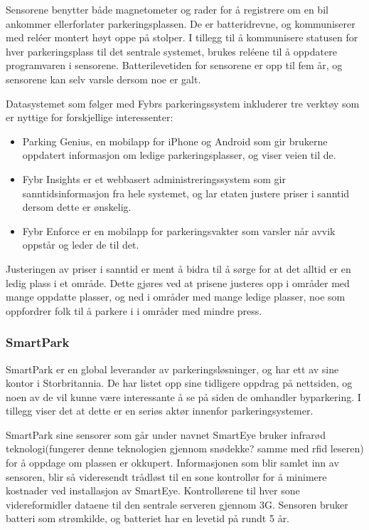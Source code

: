 \documentclass[a4paper, norsk, 12pt]{article}
\theoremstyle{remark}
\begin{document}
Sensorene benytter både magnetometer og rader for å registrere om en bil ankommer ellerforlater parkeringsplassen. De er batteridrevne, og kommuniserer med reléer montert høyt oppe på stolper. I tillegg til å kommunisere statusen for hver parkeringsplass til det sentrale systemet, brukes reléene til å oppdatere programvaren i sensorene. Batterilevetiden for sensorene er opp til fem år, og sensorene kan selv varsle dersom noe er galt. 

Datasystemet som følger med Fybrs parkeringssystem inkluderer tre verktøy som er nyttige for forskjellige interessenter:

\begin{itemize}
	\item Parking Genius, en mobilapp for iPhone og Android  som gir brukerne oppdatert informasjon om ledige parkeringsplasser, og viser veien til de.
	\item Fybr Insights er et webbasert administreringssystem som gir sanntidsinformasjon fra hele systemet, og lar etaten justere priser i sanntid dersom dette er ønskelig.
	\item Fybr Enforce er en mobilapp for parkeringsvakter som varsler når avvik oppstår og leder de til det.
\end{itemize}

Justeringen av priser i sanntid er ment å bidra til å sørge for at det alltid er en ledig plass i et område. Dette gjøres ved at prisene justeres opp i områder med mange oppdatte plasser, og ned i områder med mange ledige plasser, noe som oppfordrer folk til å parkere i i områder med mindre press.


\clearpage
\subsubsection{SmartPark}
\label{ssub:smartpark}
SmartPark er en global leverandør av parkeringsløsninger, og har ett av sine kontor i Storbritannia. De har listet opp sine tidligere oppdrag på nettsiden, og noen av de vil kunne være interessante å se på siden de omhandler byparkering. I tillegg viser det at dette er en seriøs aktør innenfor parkeringsystemer. 

SmartPark sine sensorer som går under navnet SmartEye bruker infrarød teknologi(fungerer denne teknologien gjennom snødekke? samme med rfid leseren) for å oppdage om plassen er okkupert. Informasjonen som blir samlet inn av sensoren, blir så videresendt trådløst til en sone kontrollør for å minimere kostnader ved installasjon av SmartEye. Kontrollørene til hver sone videreformidler dataene til den sentrale serveren gjennom 3G. Sensoren bruker batteri som strømkilde, og batteriet har en levetid på rundt 5 år. 
\end{document}
